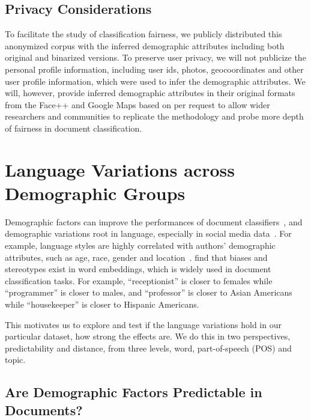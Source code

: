 \subsection{Privacy Considerations}

To facilitate the study of classification fairness, we publicly distributed this anonymized corpus with the inferred demographic attributes including both original and binarized versions.
To preserve user privacy, we will not publicize the personal profile information, including user ids, photos, geocoordinates and other user profile information, which were used to infer the demographic attributes.
We will, however, provide inferred demographic attributes in their original formats from the Face++ and Google Maps based on per request to allow wider researchers and communities to replicate the methodology and probe more depth of fairness in document classification.


\section{Language Variations across Demographic Groups}
\label{chap5:subsec:analysis}

Demographic factors can improve the performances of document classifiers~\cite{hovy2015demographic}, and demographic variations root in language, especially in social media data~\cite{volkova2013exploring, hovy2015demographic}.
For example, language styles are highly correlated with authors' demographic attributes, such as age, race, gender and location~\cite{coulmas2013sociolinguistics, preoctiuc2018user}. 
\cite{bolukbasi2016man, zhao2017men, garg2018word} find that biases and stereotypes exist in word embeddings, which is widely used in document classification tasks. For example, ``receptionist'' is closer to females while ``programmer'' is closer to males, and ``professor'' is closer to Asian Americans while ``housekeeper'' is closer to Hispanic Americans.

This motivates us to explore and test if the language variations hold in our particular dataset, how strong the effects are.
We do this in two perspectives, predictability and distance, from three levels, word, part-of-speech (POS) and topic.


\subsection{Are Demographic Factors Predictable in Documents?}
\label{chap5:subsec:pred}

